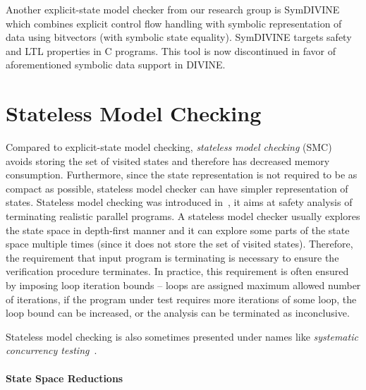Another explicit-state model checker from our research group is
\textsf{SymDIVINE}~ which combines explicit control flow
handling with symbolic representation of data using bitvectors (with symbolic
state equality).
\textsf{SymDIVINE} targets safety and LTL properties in C programs.
This tool is now discontinued in favor of aforementioned symbolic data support
in DIVINE.


\section{Stateless Model Checking}\label{sec:stateoftheart:smc}

Compared to explicit-state model checking, \emph{stateless model checking}
(SMC) avoids storing the set of visited states and therefore has decreased
memory consumption.
Furthermore, since the state representation is not required to be as compact as
possible, stateless model checker can have simpler representation of states.
Stateless model checking was introduced in~, it aims at
safety analysis of terminating realistic parallel programs.
A stateless model checker usually explores the state space in depth-first
manner and it can explore some parts of the state space multiple times (since
it does not store the set of visited states).
Therefore, the requirement that input program is terminating is necessary to
ensure the verification procedure terminates.
In practice, this requirement is often ensured by imposing loop iteration
bounds -- loops are assigned maximum allowed number of iterations, if the
program under test requires more iterations of some loop, the loop bound can be
increased, or the analysis can be terminated as inconclusive.

Stateless model checking is also sometimes presented under names like \emph{systematic concurrency testing}~.

\paragraph{State Space Reductions}

